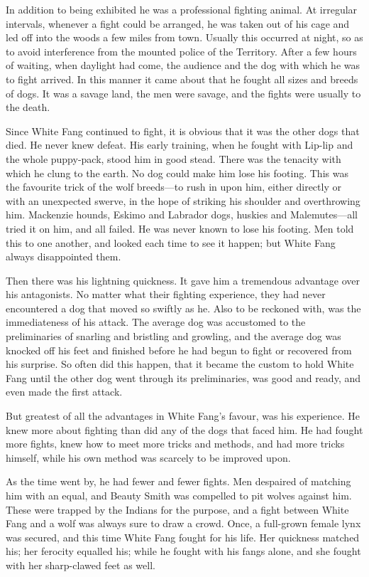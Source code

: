 \documentclass[10pt]{book}
\begin{document}
In addition to being exhibited he was a professional fighting animal.
At irregular intervals, whenever a fight could be arranged, he was
taken out of his cage and led off into the woods a few miles from town.
Usually this occurred at night, so as to avoid interference from the
mounted police of the Territory. After a few hours of waiting, when
daylight had come, the audience and the dog with which he was to fight
arrived. In this manner it came about that he fought all sizes and
breeds of dogs. It was a savage land, the men were savage, and the
fights were usually to the death.

Since White Fang continued to fight, it is obvious that it was the
other dogs that died. He never knew defeat. His early training, when he
fought with Lip-lip and the whole puppy-pack, stood him in good stead.
There was the tenacity with which he clung to the earth. No dog could
make him lose his footing. This was the favourite trick of the wolf
breeds—to rush in upon him, either directly or with an unexpected
swerve, in the hope of striking his shoulder and overthrowing him.
Mackenzie hounds, Eskimo and Labrador dogs, huskies and Malemutes—all
tried it on him, and all failed. He was never known to lose his
footing. Men told this to one another, and looked each time to see it
happen; but White Fang always disappointed them.

Then there was his lightning quickness. It gave him a tremendous
advantage over his antagonists. No matter what their fighting
experience, they had never encountered a dog that moved so swiftly as
he. Also to be reckoned with, was the immediateness of his attack. The
average dog was accustomed to the preliminaries of snarling and
bristling and growling, and the average dog was knocked off his feet
and finished before he had begun to fight or recovered from his
surprise. So often did this happen, that it became the custom to hold
White Fang until the other dog went through its preliminaries, was good
and ready, and even made the first attack.

But greatest of all the advantages in White Fang’s favour, was his
experience. He knew more about fighting than did any of the dogs that
faced him. He had fought more fights, knew how to meet more tricks and
methods, and had more tricks himself, while his own method was scarcely
to be improved upon.

As the time went by, he had fewer and fewer fights. Men despaired of
matching him with an equal, and Beauty Smith was compelled to pit
wolves against him. These were trapped by the Indians for the purpose,
and a fight between White Fang and a wolf was always sure to draw a
crowd. Once, a full-grown female lynx was secured, and this time White
Fang fought for his life. Her quickness matched his; her ferocity
equalled his; while he fought with his fangs alone, and she fought with
her sharp-clawed feet as well.
\end{document}
